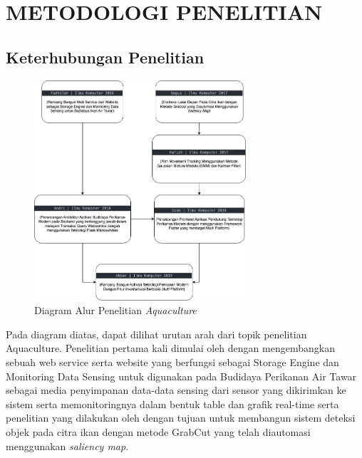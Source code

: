 
\chapter{METODOLOGI PENELITIAN}

\section{Keterhubungan Penelitian}

\begin{figure}[H]
	\centering
	\includegraphics[width=0.7\textwidth]{gambar/research_tree.png}
	\caption{Diagram Alur Penelitian \textit{Aquaculture}}
\end{figure}

Pada diagram diatas, dapat dilihat urutan arah dari topik penelitian Aquaculture. Penelitian pertama kali dimulai oleh \citep{fadhil2021} dengan mengembangkan sebuah web service serta website yang berfungsi sebagai Storage Engine dan Monitoring Data Sensing untuk digunakan pada Budidaya Perikanan Air Tawar sebagai media penyimpanan data-data sensing dari sensor yang dikirimkan ke sistem serta memonitoringnya dalam bentuk table dan grafik real-time serta penelitian yang dilakukan oleh \citep{bagus2022} dengan tujuan untuk membangun sistem deteksi objek pada citra ikan dengan metode GrabCut yang telah diautomasi menggunakan \textit{saliency map}. 

